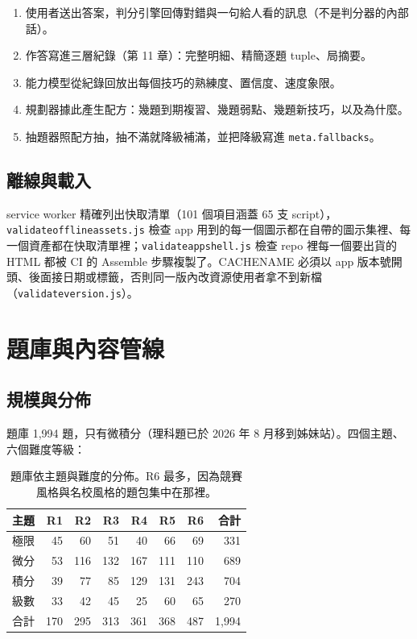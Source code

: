 \documentclass[11pt,a4paper,oneside]{report}
\renewcommand{\_}{\ifmmode\origunderscore\else\textunderscore\allowbreak\fi}
\newcommand{\code}[1]{\texttt{#1}}
\newcommand{\file}[1]{\texttt{\small #1}}
\begin{document}
\begin{enumerate}[label=\arabic*.]
  \item 使用者送出答案，判分引擎回傳對錯與一句給人看的訊息（不是判分器的內部話）。
  \item 作答寫進三層紀錄（第 11 章）：完整明細、精簡逐題 tuple、局摘要。
  \item 能力模型從紀錄回放出每個技巧的熟練度、置信度、速度象限。
  \item 規劃器據此產生配方：幾題到期複習、幾題弱點、幾題新技巧，以及為什麼。
  \item 抽題器照配方抽，抽不滿就降級補滿，並把降級寫進 \code{meta.fallbacks}。
\end{enumerate}

\section{離線與載入}
service worker 精確列出快取清單（101 個項目涵蓋 65 支 script），\file{validate\_offline\_assets.js} 檢查 app 用到的每一個圖示都在自帶的圖示集裡、每一個資產都在快取清單裡；\file{validate\_app\_shell.js} 檢查 repo 裡每一個要出貨的 HTML 都被 CI 的 Assemble 步驟複製了。CACHE\_NAME 必須以 app 版本號開頭、後面接日期或標籤，否則同一版內改資源使用者拿不到新檔（\file{validate\_version.js}）。

\chapter{題庫與內容管線}
\section{規模與分佈}
題庫 1,994 題，只有微積分（理科題已於 2026 年 8 月移到姊妹站）。四個主題、六個難度等級：

\begin{table}[h]
\centering\small\sffamily
\begin{tabular}{@{}lrrrrrrr@{}}
\toprule
主題 & R1 & R2 & R3 & R4 & R5 & R6 & 合計 \\
\midrule
極限 & 45 & 60 & 51 & 40 & 66 & 69 & 331 \\
微分 & 53 & 116 & 132 & 167 & 111 & 110 & 689 \\
積分 & 39 & 77 & 85 & 129 & 131 & 243 & 704 \\
級數 & 33 & 42 & 45 & 25 & 60 & 65 & 270 \\
\midrule
合計 & 170 & 295 & 313 & 361 & 368 & 487 & 1,994 \\
\bottomrule
\end{tabular}
\caption{題庫依主題與難度的分佈。R6 最多，因為競賽風格與名校風格的題包集中在那裡。}
\end{table}
\end{document}
